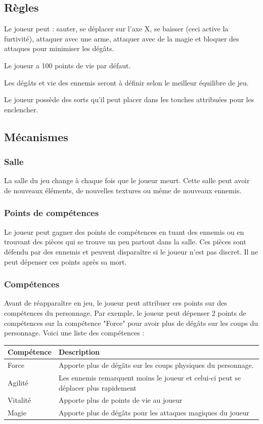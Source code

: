 \documentclass[11pt, a4paper, oneside]{report}
\begin{document}
\subsection{Règles}
\begin{description}
	\item Le joueur peut : sauter, se déplacer sur l'axe X, se baisser (ceci active la furtivité), attaquer avec une arme, attaquer avec de la magie et bloquer des attaques pour minimiser les dégâts.
	\item Le joueur a 100 points de vie par défaut.
	\item Les dégâts et vie des ennemis seront à définir selon le meilleur équilibre de jeu.
	\item Le joueur possède des sorts qu'il peut placer dans les touches attribuées pour les enclencher.
\end{description}

\subsection{Mécanismes}
\subsubsection{Salle}
La salle du jeu change à chaque fois que le joueur meurt. Cette salle peut avoir de nouveaux éléments, de nouvelles textures ou même de nouveaux ennemis.

\subsubsection{Points de compétences}
Le joueur peut gagner des points de compétences en tuant des ennemis ou en trouvant des pièces qui se trouve un peu partout dans la salle. Ces pièces sont défendu par des ennemis et peuvent disparaître si le joueur n'est pas discret. Il ne peut dépenser ces points après sa mort. 

\subsubsection{Compétences}
Avant de réapparaître en jeu, le joueur peut attribuer ces points sur des compétences du personnage. Par exemple, le joueur peut dépenser 2 points de compétences sur la compétence "Force" pour avoir plus de dégâts sur les coups du personnage. Voici une liste des compétences :

\begin{center}
\begin{tabularx}{\textwidth}{l X}
	\hline
	\textbf{Compétence} & \textbf{Description}\\
	\hline \hline
	Force & Apporte plus de dégâts sur les coups physiques du personnage.\\
	Agilité & Les ennemis remarquent moins le joueur et celui-ci peut se déplacer plus rapidement\\
	Vitalité & Apporte plus de points de vie au joueur\\
	Magie & Apporte plus de dégâts pour les attaques magiques du joueur\\
	\hline
\end{tabularx}
\end{center}
\end{document}
